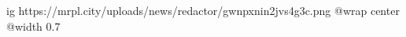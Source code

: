  
 
 
 
 

\ifcmt
  ig https://mrpl.city/uploads/news/redactor/gwnpxnin2jvs4g3c.png
  @wrap center
  @width 0.7
\fi
